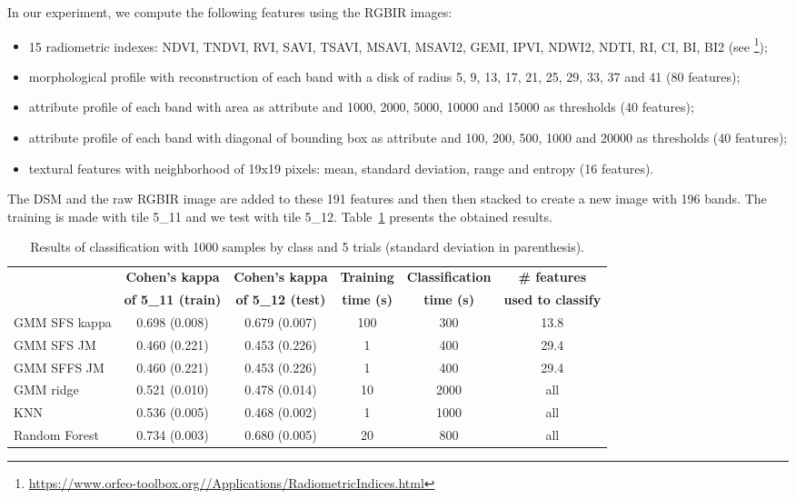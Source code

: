 \documentclass[a4paper,11pt,DIV=16,abstracton]{scrartcl}
\begin{document}
        In our experiment, we compute the following features using the RGBIR images:
        \begin{itemize}
            \item 15 radiometric indexes: NDVI, TNDVI, RVI, SAVI, TSAVI, MSAVI, MSAVI2, GEMI, IPVI, NDWI2, NDTI, RI, CI, BI, BI2 (see \footnote{\url{https://www.orfeo-toolbox.org//Applications/RadiometricIndices.html}});
            \item morphological profile with reconstruction of each band with a disk of radius 5, 9, 13, 17, 21, 25, 29, 33, 37 and 41 (80 features)\cite{tuia2015multiclass};
            \item attribute profile of each band with area as attribute and 1000, 2000, 5000, 10000 and 15000 as thresholds (40 features)\cite{tuia2015multiclass};
            \item attribute profile of each band with diagonal of bounding box as attribute and 100, 200, 500, 1000 and 20000 as thresholds (40 features)\cite{tuia2015multiclass};
            \item textural features with neighborhood of 19x19 pixels: mean, standard deviation, range and entropy (16 features)\cite{tuia2015multiclass}.
        \end{itemize}
        The DSM and the raw RGBIR image are added to these 191 features and then then stacked to create a new image with 196 bands. The training is made with tile 5\_11 and we test with tile 5\_12. Table~\ref{tab:potsdam-otbsimu} presents the obtained results.

        \begin{table}[!ht]
            \centering
            \begin{tabular}{|l|c|c|c|c|c|}\hline
                 & {\bfseries Cohen's kappa} & {\bfseries Cohen's kappa} & {\bfseries Training} & {\bfseries Classification} & {\bfseries \# features} \\
                 & {\bfseries of 5\_11 (train)} & {\bfseries of 5\_12 (test)} & {\bfseries time (s)} & {\bfseries time (s)} & {\bfseries used to classify} \\ \hline

                GMM SFS kappa & 0.698 (0.008) & 0.679 (0.007) & 100 & 300 & 13.8 \\
                GMM SFS JM &    0.460 (0.221) & 0.453 (0.226) & 1 & 400   & 29.4 \\
                GMM SFFS JM &   0.460 (0.221) & 0.453 (0.226) & 1 & 400   & 29.4 \\
                GMM ridge &     0.521 (0.010) & 0.478 (0.014) & 10 & 2000 & all \\
                KNN &           0.536 (0.005) & 0.468 (0.002) & 1 & 1000  & all \\
                Random Forest & 0.734 (0.003) & 0.680 (0.005) & 20 & 800  & all \\

                \hline
            \end{tabular}
            \caption{Results of classification with 1000 samples by class and 5 trials (standard deviation in parenthesis).\label{tab:potsdam-otbsimu}}
        \end{table}
\end{document}
